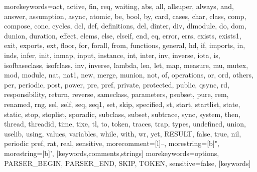   {morekeywords={act, active, fin, req, waiting, abs, all, allsuper, always, and, answer, 
     assumption, async, atomic, be, bool, by, card, cases, char, class, comp, compose, conc, cycles,
     dcl, def, definitions, del, dinter, div, dlmodule, do, dom, dunion, duration, effect, elems, else, elseif, end,
     eq, error, errs, exists, exists1, exit, exports, ext, floor, for, forall, from, functions, 
     general, hd, if, imports, in, inds, infer, init, inmap, input, instance, int, inter, inv, inverse, iota, is, 
     isofbaseclass, isofclass, inv, inverse, lambda, len, let, map, measure, mu,
     mutex, mod, module, nat, nat1, new, merge, 
     munion, not, of, operations, or, ord, others, per, periodic, post, power, pre, pref, 
     private, protected, public, qsync, rd, responsibility, return, reverse,  
     sameclass, parameters, psubset, pure, rem, renamed, rng, sel, self, seq, seq1, set, skip, specified, st, 
     start, startlist, state, static, stop, stoplist, sporadic, subclass, subset, subtrace, sync, system, then, thread, 
     threadid, time, tixe, tl, to, token, traces, trap, types, undefined,
     union, uselib, using, values, 
     variables, while, with, wr, yet, RESULT, false, true, nil, periodic pref, rat, real},
   sensitive,
   morecomment=[l]--,
   morestring=[b]",
   morestring=[b]',
  }[keywords,comments,strings]
  {morekeywords={options, PARSER\_BEGIN, PARSER\_END, SKIP, TOKEN},
   sensitive=false,
  }[keywords]
